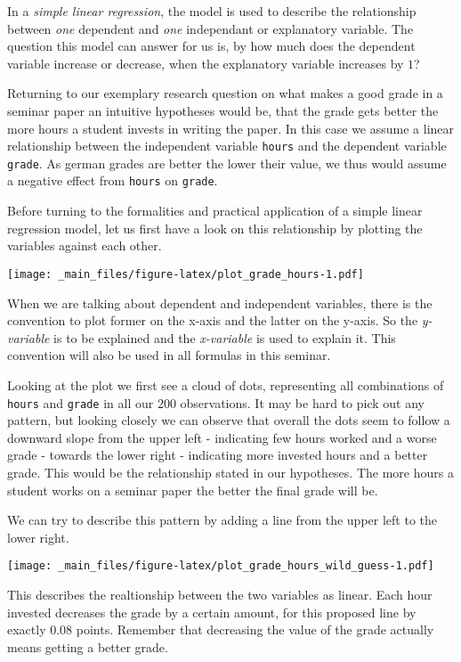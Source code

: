 \documentclass[
]{book}
\begin{document}
In a \emph{simple linear regression}, the model is used to describe the relationship
between \emph{one} dependent and \emph{one} independant or explanatory variable. The
question this model can answer for us is, by how much does the dependent
variable increase or decrease, when the explanatory variable increases by \(1\)?

Returning to our exemplary research question on what makes a good grade in a
seminar paper an intuitive hypotheses would be, that the grade gets better the
more hours a student invests in writing the paper. In this case we assume a
linear relationship between the independent variable \texttt{hours} and the dependent
variable \texttt{grade}. As german grades are better the lower their value, we thus
would assume a negative effect from \texttt{hours} on \texttt{grade}.

Before turning to the formalities and practical application of a simple linear
regression model, let us first have a look on this relationship by plotting the
variables against each other.

\texttt{[image: \_main\_files/figure-latex/plot\_grade\_hours-1.pdf]}

When we are talking about dependent and independent variables, there is the
convention to plot former on the x-axis and the latter on the y-axis. So the
\emph{y-variable} is to be explained and the \emph{x-variable} is used to explain it.
This convention will also be used in all formulas in this seminar.

Looking at the plot we first see a cloud of dots, representing all combinations
of \texttt{hours} and \texttt{grade} in all our \(200\) observations. It may be hard to pick out
any pattern, but looking closely we can observe that overall the dots seem to
follow a downward slope from the upper left - indicating few hours worked and a
worse grade - towards the lower right - indicating more invested hours and a
better grade. This would be the relationship stated in our hypotheses. The more
hours a student works on a seminar paper the better the final grade will be.

We can try to describe this pattern by adding a line from the upper left to the
lower right.

\texttt{[image: \_main\_files/figure-latex/plot\_grade\_hours\_wild\_guess-1.pdf]}

This describes the realtionship between the two variables as linear. Each hour
invested decreases the grade by a certain amount, for this proposed line by
exactly \(0.08\) points. Remember that decreasing the value of the grade actually
means getting a better grade.
\end{document}
